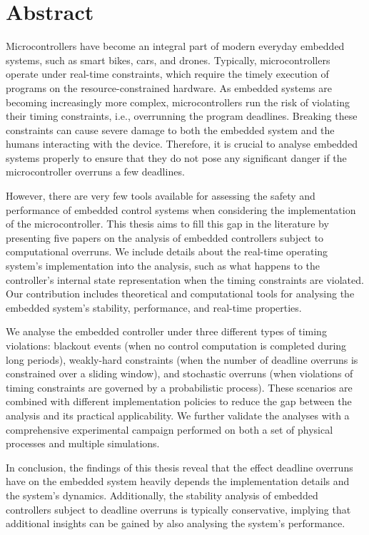 \chapter*{Abstract}

Microcontrollers have become an integral part of modern everyday embedded systems, such as smart bikes, cars, and drones.
Typically, microcontrollers operate under real-time constraints, which require the timely execution of programs on the resource-constrained hardware.
As embedded systems are becoming increasingly more complex, microcontrollers run the risk of violating their timing constraints, i.e., overrunning the program deadlines.
Breaking these constraints can cause severe damage to both the embedded system and the humans interacting with the device.
Therefore, it is crucial to analyse embedded systems properly to ensure that they do not pose any significant danger if the microcontroller overruns a few deadlines.

However, there are very few tools available for assessing the safety and performance of embedded control systems when considering the implementation of the microcontroller.
This thesis aims to fill this gap in the literature by presenting five papers on the analysis of embedded controllers subject to computational overruns.
We include details about the real-time operating system's implementation into the analysis, such as what happens to the controller's internal state representation when the timing constraints are violated.
Our contribution includes theoretical and computational tools for analysing the embedded system's stability, performance, and real-time properties.

We analyse the embedded controller under three different types of timing violations: blackout events (when no control computation is completed during long periods), weakly-hard constraints (when the number of deadline overruns is constrained over a sliding window), and stochastic overruns (when violations of timing constraints are governed by a probabilistic process).
These scenarios are combined with different implementation policies to reduce the gap between the analysis and its practical applicability.
We further validate the analyses with a comprehensive experimental campaign performed on both a set of physical processes and multiple simulations.

In conclusion, the findings of this thesis reveal that the effect deadline overruns have on the embedded system heavily depends the implementation details and the system's dynamics.
Additionally, the stability analysis of embedded controllers subject to deadline overruns is typically conservative, implying that additional insights can be gained by also analysing the system's performance.



